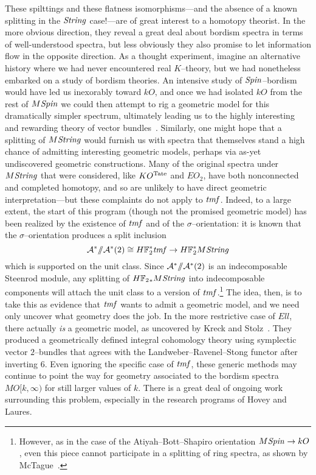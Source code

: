 These spilttings and these flatness isomorphisms---and the absence of a known splitting in the \(\mathit{String}\) case!---are of great interest to a homotopy theorist.  In the more obvious direction, they reveal a great deal about bordism spectra in terms of well-understood spectra, but less obviously they also promise to let information flow in the opposite direction.  As a thought experiment, imagine an alternative history where we had never encountered real \(K\)--theory, but we had nonetheless embarked on a study of bordism theories.  An intensive study of \(\mathit{Spin}\)--bordism would have led us inexorably toward \(kO\), and once we had isolated \(kO\) from the rest of \(M\mathit{Spin}\) we could then attempt to rig a geometric model for this dramatically simpler spectrum, ultimately leading us to the highly interesting and rewarding theory of vector bundles~\cite[pg.\ 338]{HoveyVnEltsOfRings}.  Similarly, one might hope that a splitting of \(M\mathit{String}\) would furnish us with spectra that themselves stand a high chance of admitting interesting geometric models, perhaps via as-yet undiscovered geometric constructions.  Many of the original spectra under \(M\mathit{String}\) that were considered, like \(KO^{\mathrm{Tate}}\) and \(EO_2\), have both nonconnected and completed homotopy, and so are unlikely to have direct geometric interpretation---but these complaints do not apply to \(\mathit{tmf}\).  Indeed, to a large extent, the start of this program (though not the promised geometric model) has been realized by the existence of \(\mathit{tmf}\) and of the \(\sigma\)--orientation: it is known that the \(\sigma\)--orientation produces a split inclusion \[\mathcal A^* \mmod \mathcal A^*(2) \cong \HFtwo^* \tmf \to \HFtwo^* M\String\] which is supported on the unit class.  Since \(\mathcal A^* /\!\!/ \mathcal A^*(2)\) is an indecomposable Steenrod module, any splitting of \(\HFtwo_* M\String\) into indecomposable components will attach the unit class to a version of \(\mathit{tmf}\).\footnote{However, as in the case of the Atiyah--Bott--Shapiro orientation \(M\mathit{Spin} \to kO\), even this piece cannot participate in a splitting of ring spectra, as shown by McTague~\cite{McTague}.}  The idea, then, is to take this as evidence that \(\mathit{tmf}\) wants to admit a geometric model, and we need only uncover what geometry does the job.  In the more restrictive case of \(\mathit{Ell}\), there actually \emph{is} a geometric model, as uncovered by Kreck and Stolz~\cite{KreckStolz}.  They produced a geometrically defined integral cohomology theory using symplectic vector \(2\)--bundles that agrees with the Landweber--Ravenel--Stong functor after inverting \(6\).  Even ignoring the specific case of \(\mathit{tmf}\), these generic methods may continue to point the way for geometry associated to the bordism spectra \(MO[k, \infty)\) for still larger values of \(k\).  There is a great deal of ongoing work surrounding this problem, especially in the research programs of Hovey and Laures.

